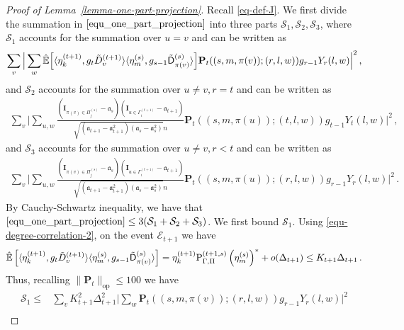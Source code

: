 \documentclass[11pt]{article}
\numberwithin{equation}{section}
\begin{document}
\begin{proof}[Proof of Lemma~\ref{lemma-one-part-projection}]
Recall \eqref{eq-def-J}. We first divide the summation in $\eqref{equ_one_part_projection}$ into three parts $\mathcal S_1, \mathcal S_2, \mathcal S_3$, where $\mathcal S_1$ accounts for the summation over $u=v$ and can be written as
\begin{align*}
    \sum_{v} \Big| \sum_{w} \Hat{\mathbb{E}} \Big[ \langle \eta^{(t+1)}_k, g_t\Tilde{D}^{(t+1)}_v \rangle \langle \eta^{(s)}_m , g_{s-1}\Tilde{\mathsf{D}}^{(s)}_{\pi(v)} \rangle \Big] \mathbf{P}_t ((s,m,\pi(v));(r,l,w)) g_{r-1} Y_r(l,w)   \Big|^2\,,
\end{align*}
and $\mathcal S_2$ accounts for the summation over $u \neq v, r=t$ and can be written as
\begin{align*}
    \sum_{v} \Big| \sum_{u,w} \frac{(\mathbf{I}_{ \pi(v) \in \Pi^{(s)}_j }-\mathfrak{a}_s) ( \mathbf{I}_{u \in \Gamma^{(t+1)}_i } -\mathfrak{a}_{t+1}) }{ \sqrt{(\mathfrak{a}_{t+1} - \mathfrak{a}_{t+1}^2) (\mathfrak{a}_s-\mathfrak{a}_s^2)}n} \mathbf{P}_t((s,m,\pi(u));(t,l,w)) g_{t-1} Y_t(l,w) \Big|^2 \,,
\end{align*}
and $\mathcal S_3$ accounts for the summation over $u \neq v, r<t$ and can be written as
\begin{align*}
    \sum_{v} \Big| \sum_{u,w}  \frac{( \mathbf{I}_{ \pi(v) \in \Pi^{(s)}_j}-\mathfrak{a}_s) ( \mathbf{I}_{u \in \Gamma^{(t+1)}_i} -\mathfrak{a}_{t+1}) }{ \sqrt{(\mathfrak{a}_{t+1}- \mathfrak{a}_{t+1}^2) (\mathfrak{a}_s - \mathfrak{a}_s^2)} n} \mathbf{P}_t((s,m,\pi(u));(r,l,w)) g_{r-1} Y_r(l,w) \Big|^2 \,.
\end{align*}
By Cauchy-Schwartz inequality, we have that $\eqref{equ_one_part_projection} \leq 3 (\mathcal S_1 + \mathcal S_2 + \mathcal S_3)$. We first bound $\mathcal S_1$. Using \eqref{equ-degree-correlation-2}, on the event $\mathcal{E}_{t+1}$ we have 
\begin{align*}
    \Hat{\mathbb{E}} \left[ \langle \eta^{(t+1)}_k, g_t\Tilde{D}^{(t+1)}_v \rangle \langle \eta^{(s)}_m, g_{s-1}\Tilde{\mathsf{D}}^{(s)}_{\pi(v)} \rangle \right] = \eta^{(t+1)}_k \mathrm{P}_{\Gamma,\Pi}^{(t+1,s)} \left(\eta^{(s)}_m \right)^{*} + o(\Delta_{t+1}) \leq K_{t+1} \Delta_{t+1}   \,.
\end{align*}
Thus, recalling $\| \mathbf{P}_t \|_{\mathrm{op}} \leq 100$ we have
\begin{align}
    \mathcal S_1 \leq & \sum_{v} K_{t+1}^2 \Delta_{t+1}^2 \Big| \sum_{w} \mathbf{P}_t ((s,m,\pi(v));(r,l,w)) g_{r-1} Y_r(l,w) \Big|^2 \nonumber \\

\end{align}
\end{proof}
\end{document}
